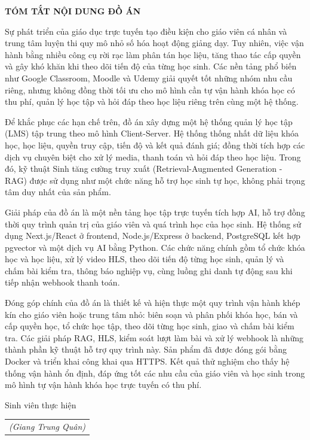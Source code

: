 \documentclass[../DoAn.tex]{subfiles}
\begin{document}
\begin{center}
    \Large{\textbf{TÓM TẮT NỘI DUNG ĐỒ ÁN}}\\
\end{center}
\vspace{1cm}

Sự phát triển của giáo dục trực tuyến tạo điều kiện cho giáo viên cá nhân và trung tâm luyện thi quy mô nhỏ số hóa hoạt động giảng dạy. Tuy nhiên, việc vận hành bằng nhiều công cụ rời rạc làm phân tán học liệu, tăng thao tác cấp quyền và gây khó khăn khi theo dõi tiến độ của từng học sinh. Các nền tảng phổ biến như Google Classroom, Moodle và Udemy giải quyết tốt những nhóm nhu cầu riêng, nhưng không đồng thời tối ưu cho mô hình cần tự vận hành khóa học có thu phí, quản lý học tập và hỏi đáp theo học liệu riêng trên cùng một hệ thống.

Để khắc phục các hạn chế trên, đồ án xây dựng một hệ thống quản lý học tập (LMS) tập trung theo mô hình Client-Server. Hệ thống thống nhất dữ liệu khóa học, học liệu, quyền truy cập, tiến độ và kết quả đánh giá; đồng thời tích hợp các dịch vụ chuyên biệt cho xử lý media, thanh toán và hỏi đáp theo học liệu. Trong đó, kỹ thuật Sinh tăng cường truy xuất (Retrieval-Augmented Generation - RAG) được sử dụng như một chức năng hỗ trợ học sinh tự học, không phải trọng tâm duy nhất của sản phẩm.

Giải pháp của đồ án là một nền tảng học tập trực tuyến tích hợp AI, hỗ trợ đồng thời quy trình quản trị của giáo viên và quá trình học của học sinh. Hệ thống sử dụng Next.js/React ở frontend, Node.js/Express ở backend, PostgreSQL kết hợp pgvector và một dịch vụ AI bằng Python. Các chức năng chính gồm tổ chức khóa học và học liệu, xử lý video HLS, theo dõi tiến độ từng học sinh, quản lý và chấm bài kiểm tra, thông báo nghiệp vụ, cùng luồng ghi danh tự động sau khi tiếp nhận webhook thanh toán.

Đóng góp chính của đồ án là thiết kế và hiện thực một quy trình vận hành khép kín cho giáo viên hoặc trung tâm nhỏ: biên soạn và phân phối khóa học, bán và cấp quyền học, tổ chức học tập, theo dõi từng học sinh, giao và chấm bài kiểm tra. Các giải pháp RAG, HLS, kiểm soát lượt làm bài và xử lý webhook là những thành phần kỹ thuật hỗ trợ quy trình này. Sản phẩm đã được đóng gói bằng Docker và triển khai công khai qua HTTPS. Kết quả thử nghiệm cho thấy hệ thống vận hành ổn định, đáp ứng tốt các nhu cầu của giáo viên và học sinh trong mô hình tự vận hành khóa học trực tuyến có thu phí.

\begin{flushright}
Sinh viên thực hiện\\
\begin{tabular}{@{}c@{}}
\textit{(Giang Trung Quân)}\\
\end{tabular}
\end{flushright}
\end{document}
